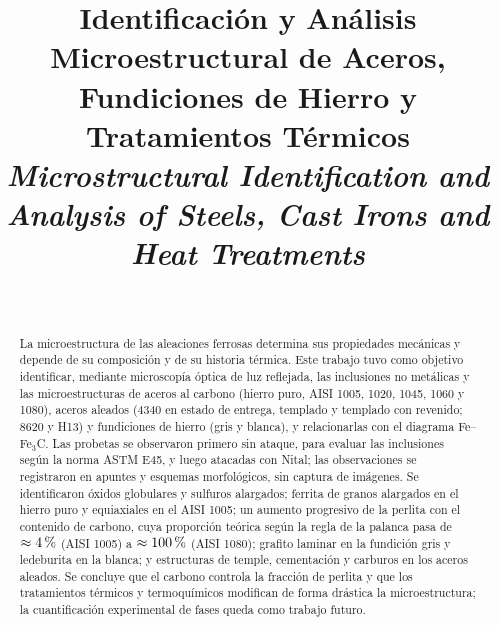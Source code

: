 \documentclass[journal,11pt]{IEEEtran}
\newcommand{\pct}{\ifmmode\mskip\thinmuskip\mathchar"0025\relax\else\,\char37\relax\fi}
\newcommand{\FeFeC}{Fe--Fe$_3$C}
\begin{document}
\title{Identificación y Análisis Microestructural de Aceros, Fundiciones de Hierro y Tratamientos Térmicos\\[3pt]
\large\textit{Microstructural Identification and Analysis of Steels, Cast Irons and Heat Treatments}}

\author{
    \\
}

\maketitle

\begin{abstract}
La microestructura de las aleaciones ferrosas determina sus propiedades mecánicas y depende de su composición y de su historia térmica. Este trabajo tuvo como objetivo identificar, mediante microscopía óptica de luz reflejada, las inclusiones no metálicas y las microestructuras de aceros al carbono (hierro puro, AISI 1005, 1020, 1045, 1060 y 1080), aceros aleados (4340 en estado de entrega, templado y templado con revenido; 8620 y H13) y fundiciones de hierro (gris y blanca), y relacionarlas con el diagrama \FeFeC. Las probetas se observaron primero sin ataque, para evaluar las inclusiones según la norma ASTM E45, y luego atacadas con Nital; las observaciones se registraron en apuntes y esquemas morfológicos, sin captura de imágenes. Se identificaron óxidos globulares y sulfuros alargados; ferrita de granos alargados en el hierro puro y equiaxiales en el AISI 1005; un aumento progresivo de la perlita con el contenido de carbono, cuya proporción teórica según la regla de la palanca pasa de $\approx 4\pct$ (AISI 1005) a $\approx 100\pct$ (AISI 1080); grafito laminar en la fundición gris y ledeburita en la blanca; y estructuras de temple, cementación y carburos en los aceros aleados. Se concluye que el carbono controla la fracción de perlita y que los tratamientos térmicos y termoquímicos modifican de forma drástica la microestructura; la cuantificación experimental de fases queda como trabajo futuro.
\end{abstract}
\end{document}
